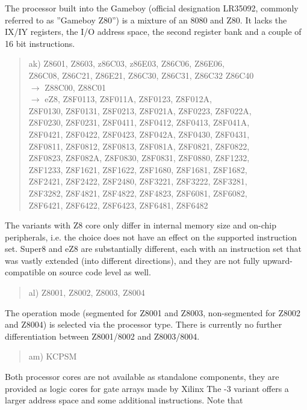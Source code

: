 \documentclass[12pt,twoside]{report}
\begin{document}
The processor built into the Gameboy (official designation LR35092,
commonly referred to as ''Gameboy Z80'') is a mixture of an 8080
and Z80.  It lacks the IX/IY registers, the I/O address space,
the second register bank and a couple of 16 bit instructions.
\begin{quote}
ak) Z8601, Z8603, z86C03, z86E03, Z86C06, Z86E06, \\
    Z86C08, Z86C21, Z86E21, Z86C30, Z86C31, Z86C32 Z86C40 \\
    $\rightarrow$ Z88C00, Z88C01 \\
    $\rightarrow$ eZ8, Z8F0113, Z8F011A, Z8F0123, Z8F012A, \\
    Z8F0130, Z8F0131, Z8F0213, Z8F021A, Z8F0223, Z8F022A, \\
    Z8F0230, Z8F0231, Z8F0411, Z8F0412, Z8F0413, Z8F041A, \\
    Z8F0421, Z8F0422, Z8F0423, Z8F042A, Z8F0430, Z8F0431, \\
    Z8F0811, Z8F0812, Z8F0813, Z8F081A, Z8F0821, Z8F0822, \\
    Z8F0823, Z8F082A, Z8F0830, Z8F0831, Z8F0880, Z8F1232, \\
    Z8F1233, Z8F1621, Z8F1622, Z8F1680, Z8F1681, Z8F1682, \\
    Z8F2421, Z8F2422, Z8F2480, Z8F3221, Z8F3222, Z8F3281, \\
    Z8F3282, Z8F4821, Z8F4822, Z8F4823, Z8F6081, Z8F6082, \\
    Z8F6421, Z8F6422, Z8F6423, Z8F6481, Z8F6482
\end{quote}
The variants with Z8 core only differ in internal memory size and
on-chip peripherals, i.e. the choice does not have an effect on the
supported instruction set.  Super8 and eZ8 are substantially different,
each with an instruction set that was vastly extended (into different
directions), and they are not fully upward-compatible on source code
level as well.
\begin{quote}
al) Z8001, Z8002, Z8003, Z8004
\end{quote}
The operation mode (segmented for Z8001 and Z8003, non-segmented for
Z8002 and Z8004) is selected via the processor type.  There is currently
no further differentiation between Z8001/8002 and Z8003/8004.
\begin{quote}
am) KCPSM
\end{quote}
Both processor cores are not available as standalone components, they are
provided as logic cores for gate arrays made by Xilinx The -3 variant
offers a larger address space and some additional instructions.  Note that
\end{document}
